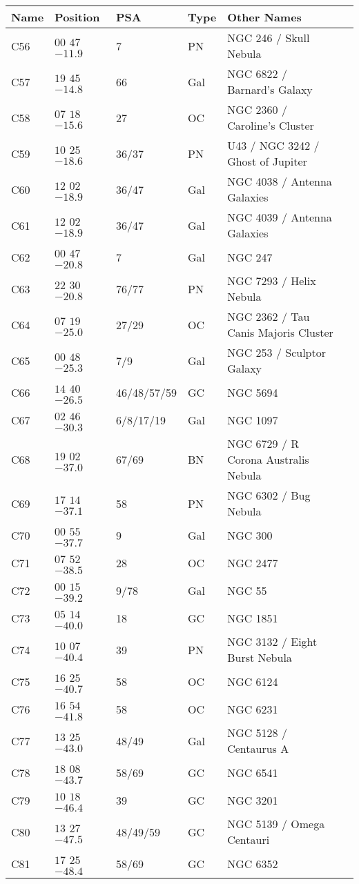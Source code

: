 \begin{table}[p]
\setlength{\tabcolsep}{3pt}
\scriptsize
\begin{tabular}{llllll}
\hline
Name&Position&PSA&Type&Other Names\\
\hline
C56&$00$ $47$ $-11.9$&7&PN&NGC 246 / Skull Nebula\\
C57&$19$ $45$ $-14.8$&66&Gal&NGC 6822 / Barnard's Galaxy\\
C58&$07$ $18$ $-15.6$&27&OC&NGC 2360 / Caroline's Cluster\\
C59&$10$ $25$ $-18.6$&36/37&PN&U43 / NGC 3242 / Ghost of Jupiter\\
C60&$12$ $02$ $-18.9$&36/47&Gal&NGC 4038 / Antenna Galaxies\\
C61&$12$ $02$ $-18.9$&36/47&Gal&NGC 4039 / Antenna Galaxies\\
C62&$00$ $47$ $-20.8$&7&Gal&NGC 247\\
C63&$22$ $30$ $-20.8$&76/77&PN&NGC 7293 / Helix Nebula\\
C64&$07$ $19$ $-25.0$&27/29&OC&NGC 2362 / Tau Canis Majoris Cluster\\
C65&$00$ $48$ $-25.3$&7/9&Gal&NGC 253 / Sculptor Galaxy\\
C66&$14$ $40$ $-26.5$&46/48/57/59&GC&NGC 5694\\
C67&$02$ $46$ $-30.3$&6/8/17/19&Gal&NGC 1097\\
C68&$19$ $02$ $-37.0$&67/69&BN&NGC 6729 / R Corona Australis Nebula\\
C69&$17$ $14$ $-37.1$&58&PN&NGC 6302 / Bug Nebula\\
C70&$00$ $55$ $-37.7$&9&Gal&NGC 300\\
C71&$07$ $52$ $-38.5$&28&OC&NGC 2477\\
C72&$00$ $15$ $-39.2$&9/78&Gal&NGC 55\\
C73&$05$ $14$ $-40.0$&18&GC&NGC 1851\\
C74&$10$ $07$ $-40.4$&39&PN&NGC 3132 / Eight Burst Nebula\\
C75&$16$ $25$ $-40.7$&58&OC&NGC 6124\\
C76&$16$ $54$ $-41.8$&58&OC&NGC 6231\\
C77&$13$ $25$ $-43.0$&48/49&Gal&NGC 5128 / Centaurus A\\
C78&$18$ $08$ $-43.7$&58/69&GC&NGC 6541\\
C79&$10$ $18$ $-46.4$&39&GC&NGC 3201\\
C80&$13$ $27$ $-47.5$&48/49/59&GC&NGC 5139 / Omega Centauri\\
C81&$17$ $25$ $-48.4$&58/69&GC&NGC 6352\\

\end{tabular}
\end{table}
